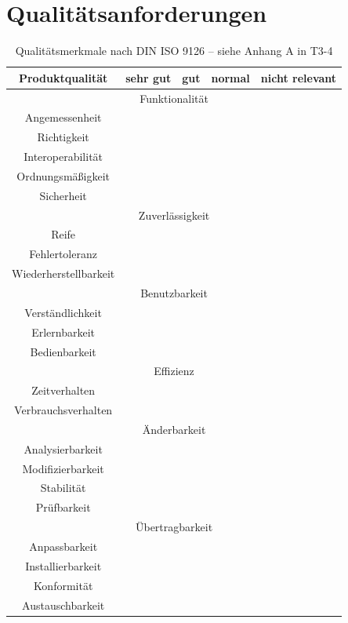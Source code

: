 	
	\section{Qualitätsanforderungen}
	\begin{table}[ht]
	\caption{Qualitätsmerkmale nach DIN ISO 9126 – siehe Anhang A in T3-4}
	\centering
		\begin{tabular}{|c|c|c|c|c|}
		\hline Produktqualität & sehr gut & gut & normal & nicht relevant \\ 
		\hline \multicolumn{5}{|c|}{Funktionalität}   \\ 
		\hline Angemessenheit &  & \checkmark &  &  \\ 
		\hline Richtigkeit &  & \checkmark  &  &  \\ 
		\hline Interoperabilität &  &\checkmark   &  &  \\ 
		\hline Ordnungsmäßigkeit &  &\checkmark   &  &  \\ 
		\hline Sicherheit &  &\checkmark   &  &  \\ 
		\hline \multicolumn{5}{|c|}{Zuverlässigkeit}   \\ 
		\hline Reife &  &\checkmark   &  &  \\ 
		\hline Fehlertoleranz &  \checkmark &  &  &  \\ 
		\hline Wiederherstellbarkeit & \checkmark  &  &  &  \\ 
		\hline \multicolumn{5}{|c|}{Benutzbarkeit}  \\ 
		\hline Verständlichkeit &  &\checkmark   &  &  \\ 
		\hline Erlernbarkeit &  & \checkmark  &  &  \\ 
		\hline Bedienbarkeit &  & \checkmark  &  &  \\ 
		\hline \multicolumn{5}{|c|}{Effizienz} \\ 
		\hline Zeitverhalten &  &  &\checkmark   &  \\ 
		\hline Verbrauchsverhalten &  &  &\checkmark   &  \\ 
		\hline \multicolumn{5}{|c|}{Änderbarkeit} \\ 
		\hline Analysierbarkeit &  & \checkmark  &  &  \\ 
		\hline Modifizierbarkeit &  & \checkmark  &  &  \\ 
		\hline Stabilität & \checkmark  &  &  &  \\ 
		\hline Prüfbarkeit & \checkmark  &  &  &  \\ 
		\hline \multicolumn{5}{|c|}{Übertragbarkeit}  \\ 
		\hline Anpassbarkeit & \checkmark  &  &  &  \\ 
		\hline Installierbarkeit & \checkmark  &  &  &  \\ 
		\hline Konformität	 &  &  &\checkmark   &  \\ 
		\hline Austauschbarkeit &  &  & \checkmark  &  \\ 
		\hline 
		\end{tabular} 
	\label{tab:quali_anf}
	\end{table}

